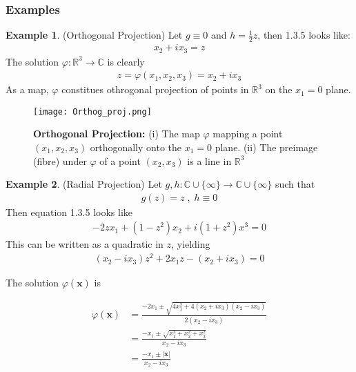 \documentclass[12pt]{article}
\theoremstyle{definition}
\newtheorem{example}{Example}[subsection]
\numberwithin{equation}{subsection}
\begin{document}
\subsubsection{Examples}
\begin{example}
(Orthogonal Projection) Let $g\equiv 0$ and $h=\frac{1}{2}z$, then 1.3.5 looks like:
\begin{align}\label{eq:21}
    x_2 + ix_3 = z
\end{align}
The solution $\varphi: \mathbb{R}^3 \rightarrow \mathbb{C}$ is clearly
\begin{align*}
    z=\varphi(x_1, x_2, x_3) = x_2 + ix_3
\end{align*}
As a map, $\varphi$ constitues othrogonal projection of points in $\mathbb{R}^3$ on the $x_1=0$ plane.
\end{example}
    \begin{figure}[H]
    \centering
    \texttt{[image: Orthog\_proj.png]}
    \caption[Orthogonal Projection]{ \textbf{Orthogonal Projection:}  \small (i) The map $\varphi$ mapping a point $(x_1, x_2, x_3)$ orthogonally onto the $x_1=0$ plane. (ii) The preimage (fibre) under $\varphi$ of a point $(x_2, x_3)$ is a line in $\mathbb{R}^3$  }
    \label{fig:Orthog}
\end{figure}

\begin{example}
(Radial Projection) Let $g, h : \mathbb{C}\cup \{\infty\} \rightarrow \mathbb{C} \cup \{\infty\}$ such that
\begin{align*}
g(z) = z \; , \; h \equiv 0    
\end{align*}
Then equation 1.3.5 looks like
\begin{align}\label{eq:22}
    -2z x_1 + (1 - z^2) x_2 + i(1 + z^2) x^3 = 0
\end{align}
This can be written as a quadratic in $z$, yielding
\begin{align}\label{eq:23}
    (x_2 - i x_3) z^2 + 2x_1z  -(x_2 + ix_3) = 0
\end{align}

The solution $\varphi(\boldsymbol{x})$ is

\begin{align*}
    \varphi(\boldsymbol{x}) &= \frac{-2x_1 \pm \sqrt{4x_1^2 + 4(x_2+ix_3)(x_2-ix_3)}}{2(x_2 - ix_3)}\\
    &=\frac{-x_1 \pm \sqrt{x_1^2 + x_2^2 + x_3^2}}{x_2 - ix_3} \\
    &=\frac{-x_1 \pm |\boldsymbol{x}|}{x_2 - ix_3}
\end{align*}
\end{example}
\end{document}

